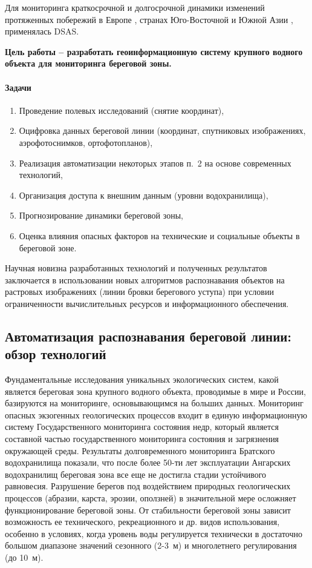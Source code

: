 \documentclass[732,14pt,final]{studrep}
\begin{document}
Для мониторинга краткосрочной и долгосрочной динамики изменений протяженных побережий в Европе \cite{kabuth14}, странах Юго-Восточной и Южной Азии \cite{isha20},\cite{Matin21} применялась DSAS.

\textbf{Цель работы  -- разработать геоинформационную систему крупного водного объекта для мониторинга береговой зоны.}

\paragraph{Задачи}
\begin{enumerate}
\item Проведение полевых исследований (снятие координат),
\item Оцифровка данных береговой линии (координат, спутниковых изображениях, аэрофотоснимков, ортофотопланов),
\item Реализация автоматизации некоторых этапов п.~2 на основе современных технологий,
\item Организация доступа к внешним данным (уровни водохранилища),
\item Прогнозирование динамики береговой зоны,
\item Оценка влияния опасных факторов на технические и социальные объекты в береговой зоне.
\end{enumerate}

Научная новизна разработанных технологий и полученных результатов заключается в использовании новых алгоритмов распознавания объектов на растровых изображениях (линии бровки берегового уступа) при условии ограниченности вычислительных ресурсов и информационного обеспечения.


\subsection*{Автоматизация распознавания береговой линии: обзор технологий}

Фундаментальные исследования уникальных экологических систем, какой является береговая зона крупного водного объекта, проводимые в мире и России, базируются на мониторинге, основывающимся на больших данных. Мониторинг опасных экзогенных геологических процессов входит в единую информационную систему Государственного мониторинга состояния недр, который является составной частью государственного мониторинга состояния и загрязнения окружающей среды. Результаты долговременного мониторинга Братского водохранилища показали, что после более 50-ти лет эксплуатации Ангарских водохранилищ береговая зона все еще не достигла стадии устойчивого равновесия. Разрушение берегов под воздействием природных геологических процессов (абразии, карста, эрозии, оползней) в значительной мере осложняет функционирование береговой зоны. От стабильности береговой зоны зависит возможность ее технического, рекреационного и др. видов использования, особенно в условиях, когда уровень воды регулируется технически в достаточно большом диапазоне значений сезонного (2-3~м) и многолетнего регулирования (до 10~м).
\end{document}

